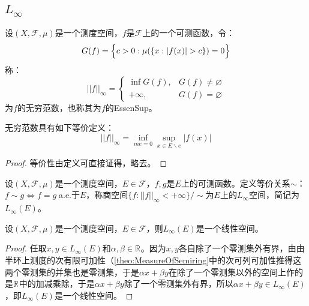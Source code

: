 \subsection{$L_{\infty}$}
\begin{definition}
	设$(X,\mathscr{F},\mu)$是一个测度空间，$f$是$\mathscr{F}$上的一个可测函数，令：
	\begin{equation*}
		G(f)=\Bigl\{c>0:\mu(\{x:|f(x)|>c\})=0\Bigr\}
	\end{equation*}
	称：
	\begin{equation*}
		||f||_{\infty}=
		\begin{cases}
			\inf G(f),&G(f)\ne\varnothing \\
			+\infty,&G(f)=\varnothing
		\end{cases}
	\end{equation*}
	为$f$的无穷范数，也称其为$f$的\gls{EssenSup}。
\end{definition}
\begin{theorem}
	无穷范数具有如下等价定义：
	\begin{equation*}
		||f||_\infty=\inf_{me=0}\sup_{x\in E\backslash e}|f(x)|
	\end{equation*}
\end{theorem}
\begin{proof}
	等价性由定义可直接证得，略去。
\end{proof}
\begin{definition}
	设$(X,\mathscr{F},\mu)$是一个测度空间，$E\in\mathscr{F}$，$f,g$是$E$上的可测函数。定义等价关系$\sim$：$f\sim g\Leftrightarrow f=g\;$a.e.于$E$，称商空间$\{f:||f||_\infty<+\infty\}/\sim$为$E$上的$L_{\infty}$空间，简记为$L_{\infty}(E)$。
\end{definition}
\begin{property}
	设$(X,\mathscr{F},\mu)$是一个测度空间，$E\in\mathscr{F}$，则$L_{\infty}(E)$是一个线性空间。
\end{property}
\begin{proof}
	任取$x,y\in L_{\infty}(E)$和$\alpha,\beta\in\mathbb{R}^{}$。因为$x,y$各自除了一个零测集外有界，由由半环上测度的次有限可加性（\cref{theo:MeasureOfSemiring}中的次可列可加性推得这两个零测集的并集也是零测集，于是$\alpha x+\beta y$在除了一个零测集以外的空间上作的是$\mathbb{R}^{}$中的加减乘除，于是$\alpha x+\beta y$除了一个零测集外有界，所以$\alpha x+\beta y\in L_{\infty}(E)$，即$L_{\infty}(E)$是一个线性空间。
\end{proof}
